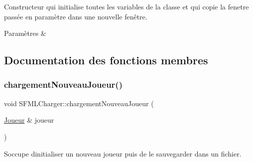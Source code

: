 Constructeur qui initialise toutes les variables de la classe et qui copie la fenetre passée en paramètre dans une nouvelle fenêtre. 


\begin{DoxyParams}{Paramètres}
{\em } & \\
\hline
\end{DoxyParams}


\subsection{Documentation des fonctions membres}
\mbox{\label{class_s_f_m_l_charger_a4c3135a3fa16c88f94cbef9c2ca2c2d8}} 
\subsubsection{\texorpdfstring{chargement\+Nouveau\+Joueur()}{chargementNouveauJoueur()}}
{\footnotesize\ttfamily void S\+F\+M\+L\+Charger\+::chargement\+Nouveau\+Joueur (\begin{DoxyParamCaption}\item[{\hyperlink{class_joueur}{Joueur} \&}]{joueur }\end{DoxyParamCaption})\hspace{0.3cm}{\ttfamily [private]}}



S\textquotesingle{}occupe d\textquotesingle{}initialiser un nouveau joueur puis de le sauvegarder dans un fichier. 


